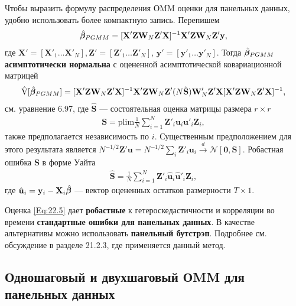 Чтобы выразить формулу распределения ОMM оценки для панельных данных, удобно использовать более компактную запись. Перепишем
\begin{align}
\hat{\bm{\beta}}_{PGMM}=[\mathbf X' \mathbf Z \mathbf W_N \mathbf Z' \mathbf X]^{-1} \mathbf X' \mathbf Z \mathbf W_N \mathbf Z' \mathbf y,
\label{Eq:22.4}
\end{align}
где  $\mathbf X'=[\mathbf X'_1 \dots \mathbf X'_N], \mathbf Z'=[\mathbf Z'_1 \dots \mathbf Z'_N]$, $\mathbf y'=[\mathbf y'_1 \dots \mathbf y'_N]$. Тогда $\hat{\bm{\beta}}_{PGMM}$ \textbf{асимптотически нормальна}  с оцененной асимптотической ковариационной матрицей
\begin{align}
\hat{\mathrm{V}} [\hat{\bm{\beta}}_{PGMM}]=[\mathbf X' \mathbf Z \mathbf W_N \mathbf Z' \mathbf X]^{-1} \mathbf X' \mathbf Z \mathbf W_N \mathbf Z' 
(N \hat{\mathbf S}) \mathbf W'_N \mathbf Z' \mathbf X
[\mathbf X' \mathbf Z \mathbf W_N \mathbf Z' \mathbf X]^{-1},
\label{Eq:22.5}
\end{align}
см. уравнение 6.97, %
где $\hat{\mathbf S}$ --- состоятельная оценка матрицы размера $r \times r$ 
\begin{align}
\mathbf S =\mathrm{plim} \frac{1}{N} \sum^N_{i=1} \mathbf Z'_i \mathbf u_i \mathbf u'_i \mathbf Z_i,
\label{Eq:22.6}
\end{align}
 также предполагается независимость по $i$. Существенным предположением для этого результата является $N^{-1/2} \mathbf Z' \mathbf u = N^{-1/2} \sum_i \mathbf Z'_i \mathbf u_i \overset{d}\rightarrow \mathcal N[\mathbf 0, \mathbf S]$. Робастная ошибка $\mathbf S$ в форме Уайта  
\begin{align}
\hat{\mathbf S} = \frac{1}{N} \sum^N_{i=1} \mathbf Z'_i \hat{\mathbf u}_i \hat{\mathbf u}'_i \mathbf Z_i,
\label{Eq:22.7}
\end{align}
где  $\hat{\mathbf u}_i=\mathbf y_i- \mathbf X_i \hat{\bm{\beta}}$ --- вектор оцененных остатков размерности $T \times 1$. 

Оценка \ref{Eq:22.5} дает \textbf{робастные} к гетероскедастичности и корреляции во времени \textbf{стандартные ошибки для панельных данных}. В качестве альтернативы можно использовать \textbf{панельный бутстрэп}. Подробнее см. обсуждение в разделе 21.2.3, где  применяется данный метод.

\subsection{Одношаговый и двухшаговый ОMM для панельных данных}

